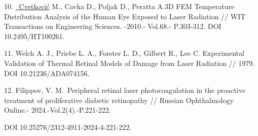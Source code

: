 \begin{references}
10. \href{https://www.researchgate.net/profile/Mario-Cvetkovic?_tp=eyJjb250ZXh0Ijp7ImZpcnN0UGFnZSI6InB1YmxpY2F0aW9uIiwicGFnZSI6InB1YmxpY2F0aW9uIn19}{~Cvetković}
M., Cavka D., Poljak D., Peratta A.3D FEM Temperature Distribution
Analysis of the Human Eye Exposed to Laser Radiation // WIT Transactions
on Engineering Sciences. -2010.- Vol.68.- P.303-312. DOI
10.2495/HT100261.

11. Welch A. J., Priebe L. A., Forster L. D., Gilbert R., Lee C.
Experimental Validation of Thermal Retinal Models of Damage from Laser
Radiation // 1979. DOI 10.21236/ADA074156.

12. Filippov, V. M.~Peripheral retinal laser photocoagulation in the
proactive treatment of proliferative diabetic retinopathy // Russian
Ophthalmology Online.- 2024.-Vol.2(4).-P.221-222.

DOI 10.25276/2312-4911-2024-4-221-222.
\end{references}

